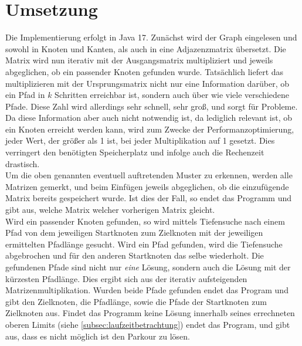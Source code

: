 \section{Umsetzung}\label{sec:umsetzung}
Die Implementierung erfolgt in Java 17.
Zunächst wird der Graph eingelesen und sowohl in Knoten und Kanten, als auch in eine Adjazenzmatrix übersetzt.
Die Matrix wird nun iterativ mit der Ausgangsmatrix multipliziert und jeweils abgeglichen, ob ein passender Knoten gefunden wurde.
Tatsächlich liefert das multiplizieren mit der Ursprungsmatrix nicht nur eine Information darüber, ob ein Pfad
in $k$ Schritten erreichbar ist, sondern auch über wie viele verschiedene Pfade.
Diese Zahl wird allerdings sehr schnell, sehr groß, und sorgt für Probleme.
Da diese Information aber auch nicht notwendig ist, da lediglich relevant ist, ob ein Knoten erreicht werden kann,
wird zum Zwecke der Performanzoptimierung,
jeder Wert, der größer als 1 ist, bei jeder Multiplikation auf 1 gesetzt.
Dies verringert den benötigten Speicherplatz und infolge auch die Rechenzeit drastisch. \\
Um die oben genannten eventuell auftretenden Muster zu erkennen, werden alle Matrizen gemerkt, und beim Einfügen
jeweils abgeglichen, ob die einzufügende Matrix bereits gespeichert wurde.
Ist dies der Fall, so endet das Programm und gibt aus, welche Matrix welcher vorherigen Matrix gleicht. \\
Wird ein passender Knoten gefunden, so wird mittels Tiefensuche nach einem Pfad von dem jeweiligen Startknoten zum Zielknoten mit
der jeweiligen ermittelten Pfadlänge gesucht.
Wird ein Pfad gefunden, wird die Tiefensuche abgebrochen und für den anderen Startknoten das selbe wiederholt.
Die gefundenen Pfade sind nicht nur \textit{eine} Lösung, sondern auch die Lösung mit der kürzesten Pfadlänge.
Dies ergibt sich aus der iterativ aufsteigenden Matrizenmultiplikation.
Wurden beide Pfade gefunden endet das Program und gibt den Zielknoten, die Pfadlänge, sowie die Pfade der Startknoten zum Zielknoten aus.
Findet das Programm keine Lösung innerhalb seines errechneten oberen Limits (siehe \autoref{subsec:laufzeitbetrachtung}) endet das Program, und gibt aus,
dass es nicht möglich ist den Parkour zu lösen.

